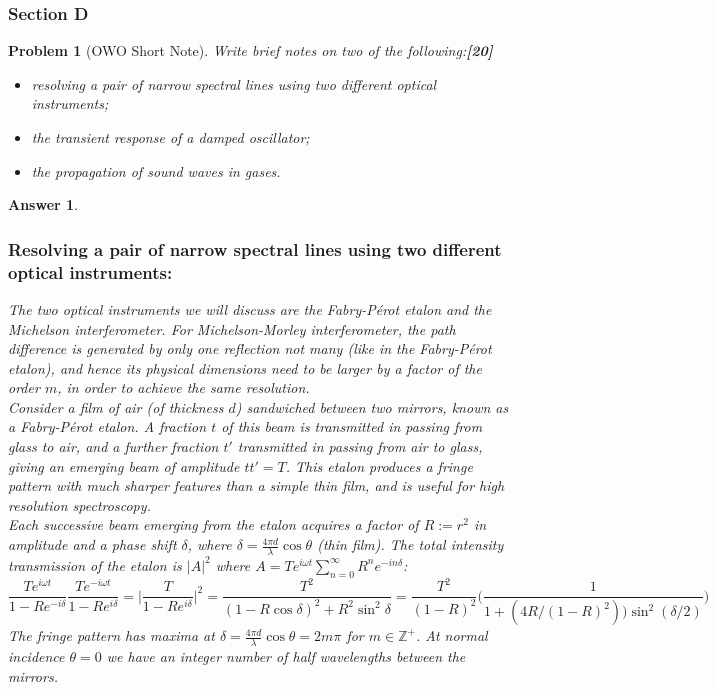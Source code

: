 \documentclass[a4paper]{article}
\newtheorem{ans}{Answer}[subsection]
\theoremstyle{new}
\newtheorem{qns}{Problem}[subsection]
\begin{document}
\subsubsection{Section D}
\begin{qns}[OWO Short Note]
Write brief notes on two of the following:\hfill\textbf{[20]}
\begin{itemize}
    \item resolving a pair of narrow spectral lines using two different optical instruments;
    \item the transient response of a damped oscillator;
    \item the propagation of sound waves in gases. 
\end{itemize}
\end{qns}
\begin{ans}\leavevmode
\subsubsection*{Resolving a pair of narrow spectral lines using two different optical instruments:}
The two optical instruments we will discuss are the Fabry-Pérot etalon and the Michelson interferometer. For Michelson-Morley interferometer, the path difference is generated by only one reflection not many (like in the Fabry-Pérot etalon), and hence its physical dimensions need to be larger by a factor of the order $m$, in order to achieve the same resolution.\\[5pt]
Consider a film of air (of thickness $d$) sandwiched between two mirrors, known as a Fabry-Pérot etalon. A fraction $t$ of this beam is transmitted in passing from glass to air, and a further fraction $t'$ transmitted in passing from air to glass, giving an emerging beam of amplitude $tt'=T$. This etalon produces a fringe pattern with much sharper features than a simple thin film, and is useful for high resolution spectroscopy. \\[5pt]
Each successive beam emerging from the etalon acquires a factor of $R:=r^2$ in amplitude and a phase shift $\delta$, where $\delta=\frac{4\pi d}{\lambda}\cos\theta$ (thin film). The total intensity transmission of the etalon is $|A|^2$ where $A=Te^{i\omega t}\sum_{n=0}^\infty R^ne^{-in\delta}$:
$$\frac{Te^{i\omega t}}{1-Re^{-i\delta}}\frac{Te^{-i\omega t}}{1-Re^{i\delta}}=\bigg|\frac{T}{1-Re^{i\delta}}\bigg|^2=\frac{T^2}{(1-R\cos\delta)^2+R^2\sin^2\delta}=\frac{T^2}{(1-R)^2}\bigg(\frac{1}{1+(4R/(1-R)^2))\sin^2(\delta/2)}\bigg)$$
The fringe pattern has maxima at $\delta=\frac{4\pi d}{\lambda}\cos\theta=2m\pi$ for $m\in\mathbb{Z}^+$. At normal incidence $\theta=0$ we have an integer number of half wavelengths between the mirrors.\\[5pt]

\end{ans}
\end{document}
